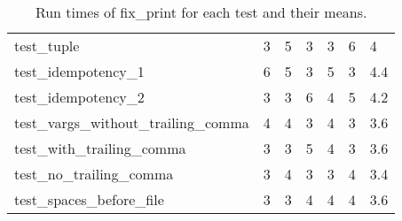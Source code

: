 \begin{table}[]
\begin{tabular}{@{}lllllll@{}}
    test\_tuple                           & 3                          & 5                          & 3                          & 3                          & 6                          & 4                                \\
    test\_idempotency\_1                  & 6                          & 5                          & 3                          & 5                          & 3                          & 4.4                              \\
    test\_idempotency\_2                  & 3                          & 3                          & 6                          & 4                          & 5                          & 4.2                              \\
    test\_vargs\_without\_trailing\_comma & 4                          & 4                          & 3                          & 4                          & 3                          & 3.6                              \\
    test\_with\_trailing\_comma           & 3                          & 3                          & 5                          & 4                          & 3                          & 3.6                              \\
    test\_no\_trailing\_comma             & 3                          & 4                          & 3                          & 3                          & 4                          & 3.4                              \\
    test\_spaces\_before\_file            & 3                          & 3                          & 4                          & 4                          & 4                          & 3.6                             
    \end{tabular}
    \caption{Run times of fix\_print for each test and their means.}
\end{table}